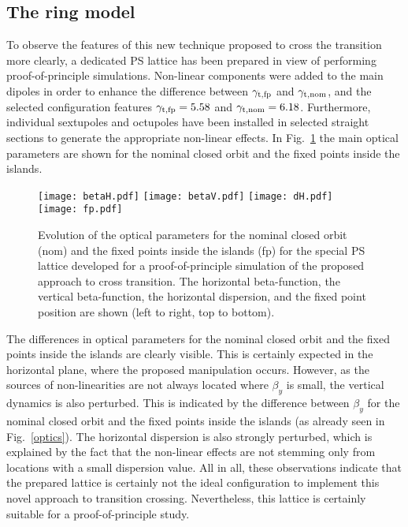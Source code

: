 \documentclass{article}
\begin{document}
\subsection{The ring model}
%
To observe the features of this new technique proposed to cross the transition more clearly, a dedicated PS lattice has been prepared in view of performing proof-of-principle simulations. Non-linear components were added to the main dipoles in order to enhance the difference between $\gamma_{\rm t, fp}$ and $\gamma_{\rm t, nom}$, and the selected configuration features $\gamma_{\rm t, fp}=5.58$ and $\gamma_{\rm t, nom}=6.18$. Furthermore, individual sextupoles and octupoles have been installed in selected straight sections to generate the appropriate non-linear effects. In Fig.~\ref{fig:model} the main optical parameters are shown for the nominal closed orbit and the fixed points inside the islands.
%
\begin{figure}[htb]
\centering
  \texttt{[image: betaH.pdf]}
  \texttt{[image: betaV.pdf]}
  \texttt{[image: dH.pdf]}
  \texttt{[image: fp.pdf]}
  \caption{Evolution of the optical parameters for the nominal closed orbit (nom) and the fixed points inside the islands (fp) for the special PS lattice developed for a proof-of-principle simulation of the proposed approach to cross transition. The horizontal beta-function, the vertical beta-function, the horizontal dispersion, and the fixed point position are shown (left to right, top to bottom).}
\label{fig:model}
\end{figure}
%

The differences in optical parameters for the nominal closed orbit and the fixed points inside the islands are clearly visible. This is certainly expected in the horizontal plane, where the proposed manipulation occurs. However, as the sources of non-linearities are not always located where $\beta_{y}$ is small, the vertical dynamics is also perturbed. This is indicated by the difference between $\beta_{y}$ for the nominal closed orbit and the fixed points inside the islands (as already seen in Fig.~\ref{optics}). The horizontal dispersion is also strongly perturbed, which is explained by the fact that the non-linear effects are not stemming only from locations with a small dispersion value. All in all, these observations indicate that the prepared lattice is certainly not the ideal configuration to implement this novel approach to transition crossing. Nevertheless, this lattice is certainly suitable for a proof-of-principle study. 
\end{document}
